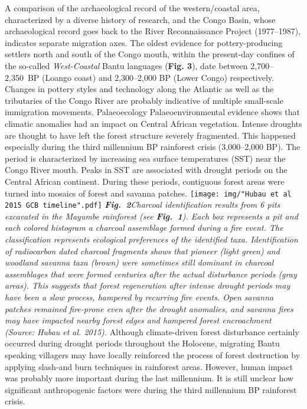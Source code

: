\documentclass[a0]{sciposter}
\begin{document}
{\begin{minipage}[t][102cm][t]{82cm}
\begin{minipage}[t]{77cm}
\begin{multicols}{3}
\bigbreak
{\fontsize{28}{36} \selectfont A comparison of the archaeological record of the western/coastal area, characterized by a diverse history of research, and the Congo Basin, whose archaeological record goes back to the River Reconnaissance Project (1977--1987), indicates separate migration axes. The oldest evidence for pottery-producing settlers north and south of the Congo mouth, within the present-day confines of the so-called \textit{West-Coastal} Bantu languages (\textbf{Fig. 3}), date between 2,700--2,350~BP (Loango coast) and 2,300--2,000 BP (Lower Congo) respectively. Changes in pottery styles and technology along the Atlantic as well as the tributaries of the Congo River are probably indicative of multiple small-scale immigration movements.}
\vfill\null
\columnbreak
{\fontsize{38}{42} \selectfont \textcolor{HeadCol}{Palaeoecology}}
\bigbreak
{\fontsize{28}{36} \selectfont Palaeoenvironmental evidence shows that climatic anomalies had an impact on Central African vegetation. Intense droughts are thought to have left the forest structure severely fragmented. This happened especially during the third millennium BP rainforest crisis (3,000--2,000 BP). The period is characterized by increasing sea surface temperatures (SST) near the Congo River mouth. Peaks in SST are associated with drought periods on the Central African continent. During these periods, contiguous forest areas were turned into mosaics of forest and savanna patches.}
\bigbreak
\colorbox{white}{\texttt{[image: img/"Hubau et al 2015 GCB timeline".pdf]}}
\bigbreak
{\fontsize{22}{0} \selectfont \textit{\textbf{Fig.~2}\hspace{1em}Charcoal identification results from 6 pits excavated in the Mayumbe rainforest (see \textbf{Fig.~1}). Each box represents a pit and each colored histogram a charcoal assemblage formed during a fire event. The classification represents ecological preferences of the identified taxa. Identification of radiocarbon dated charcoal fragments shows that pioneer (light green) and woodland savanna taxa (brown) were sometimes still dominant in charcoal assemblages that were formed centuries after the actual disturbance periods (gray areas). This suggests that forest regeneration after intense drought periods may have been a slow process, hampered by recurring fire events. Open savanna patches remained fire-prone even after the drought anomalies, and savanna fires may have impacted nearby forest edges and hampered forest encroachment (Source: Hubau et al. 2015).}}
\bigbreak
{\fontsize{28}{36} \selectfont Although climate-driven forest disturbance certainly occurred during drought periods throughout the Holocene, migrating Bantu speaking villagers may have locally reinforced the process of forest destruction by applying slash-and burn techniques in rainforest areas. However, human impact was probably more important during the last millennium. It is still unclear how significant anthropogenic factors were during the third millennium BP rainforest crisis.}

\end{multicols}
\end{minipage}
\end{minipage}}
\end{document}
